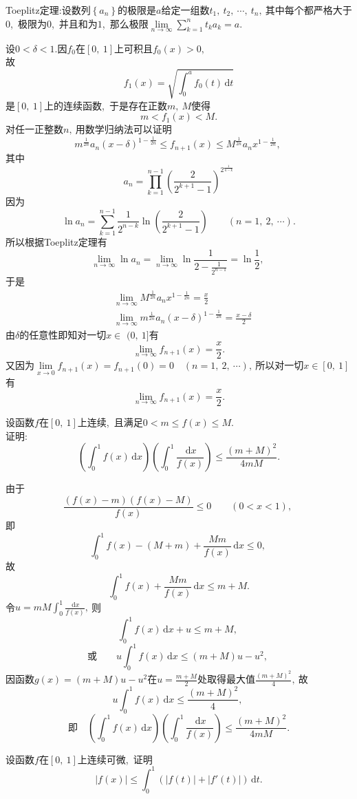 	\begin{solution}
		
		Toeplitz定理:设数列$\left\{a_n\right\}$的极限是$a$给定一组数$t_{1},\ t_{2},\ \cdots,\ t_{n},\ $其中每个都严格大于$0$,\ 极限为$0$,\ 并且和为$1$,\ 那么极限$\lim\limits_{n\rightarrow\infty}\sum\limits_{k=1}^{n}t_ka_k=a.$
		
		设$0<\delta < 1.$因$f_0$在$\left[0,\ 1\right]$上可积且$f_0(x)>0,\ $\\
		故
		$$f_1(x)=\sqrt{\int_{0}^{a}f_0(t)\,\text{d}t}$$
		是$\left[0,\ 1\right]$上的连续函数,\ 于是存在正数$m,\ M$使得
		$$m<f_1(x)<M.$$
		对任一正整数$n,\ $用数学归纳法可以证明
		$$m^{\frac{1}{2n}}a_n(x-\delta)^{1-\frac{1}{2n}}\le f_{n+1}(x)\le M^{\frac{1}{2n}}a_nx^{1-\frac{1}{2n}},\ $$
		其中
		$$a_n=\prod\limits_{k=1}^{n-1}\left(\frac{2}{2^{k+1}-1}\right)^{2^{\frac{1}{n-k}}}$$
		因为
		$$\ln a_n = \sum\limits_{k=1}^{n-1}\frac{1}{2^{n-k}}\ln \left(\frac{2}{2^{k+1}-1}\right)\qquad(n=1,\ 2,\ \cdots).$$
		所以根据Toeplitz定理有
		$$\lim\limits_{n\rightarrow\infty}\ln a_n=\lim\limits_{n\rightarrow\infty}\ln \frac{1}{2-\frac{1}{2^{n-1}}}=\ln\frac{1}{2},\ $$
		于是
		\begin{align*}
			&\lim\limits_{n\rightarrow\infty}M^{\frac{1}{2n}}a_nx^{1-\frac{1}{2n}}=\frac{x}{2}\\
			&\lim\limits_{n\rightarrow\infty}m^{\frac{1}{2n}}a_n(x-\delta)^{1-\frac{1}{2n}}=\frac{x-\delta}{2}
		\end{align*}
		由$\delta$的任意性即知对一切$x\in$ $(0,\ 1]$有
		$$\lim\limits_{n\rightarrow\infty}f_{n+1}(x)=\frac{x}{2}.$$
		又因为$\lim\limits_{x\rightarrow 0}f_{n+1}(x)=f_{n+1}(0)=0\quad(n=1,\ 2,\ \cdots),\ $所以对一切$x\in\left[0,\ 1\right]$有
		$$\lim\limits_{n\rightarrow\infty}f_{n+1}(x)=\frac{x}{2}.$$ 
	\end{solution}
	\newpage
	\begin{problem}
		设函数$f$在$\left[0,\ 1\right]$上连续,\ 且满足$0<m\le f(x)\le M.$\\证明:
		$$\left(\int_{0}^{1}f(x)\,\text{d}x\right)\left(\int_{0}^{1}\frac{\,\text{d}x}{f(x)}\right)\le \frac{(m+M)^2}{4mM}.$$
	\end{problem}
	
	\begin{solution}
		由于
		$$\frac{(f(x)-m)(f(x)-M)}{f(x)}\le 0\qquad\left(0<x<1\right),\ $$
		即$$\int_{0}^{1}f(x)-(M+m)+\frac{Mm}{f(x)}\,\text{d}x\le0,\ $$
		故$$\int_{0}^{1}f(x)+\frac{Mm}{f(x)}\,\text{d}x\le m+M.$$
		令$u=mM\int_{0}^{1}\frac{\,\text{d}x}{f(x)},\ $则
		$$\int_{0}^{1}f(x)\,\text{d}x+u\le m+M,\ $$
		$$\text{或}\qquad u\int_{0}^{1}f(x)\,\text{d}x\le \left(m+M\right)u-u^2,\ $$
		因函数$g(x)=\left(m+M\right)u-u^2$在$u=\frac{m+M}{2}$处取得最大值$\frac{\left(m+M\right)^2}{4},\ $故
		$$u\int_{0}^{1}f(x)\,\text{d}x\le \frac{\left(m+M\right)^2}{4},\ $$
		$$\text{即}\quad\left(\int_{0}^{1}f(x)\,\text{d}x\right)\left(\int_{0}^{1}\frac{\,\text{d}x}{f(x)}\right)\le \frac{(m+M)^2}{4mM}.$$ 
	\end{solution}
	\newpage
	\begin{problem}
		设函数$f$在$\left[0,\ 1\right]$上连续可微,\ 证明
		$$\left|f(x)\right|\le \int_{0}^{1}\left(|f(t)|+|f'(t)|\right)\,\text{d}t.$$
	\end{problem}
	
